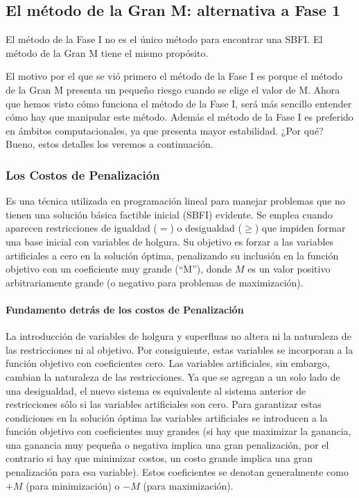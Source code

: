 \subsection{El método de la Gran M: alternativa a Fase 1}

El método de la Fase I no es el único método para encontrar una SBFI. El método de la Gran M tiene el mismo propósito.

El motivo por el que se vió primero el método de la Fase I es porque el método de la Gran M presenta un pequeño riesgo cuando se elige el valor de M. Ahora que hemos visto cómo funciona el método de la Fase I, será más sencillo entender cómo hay que manipular este método. Además el método de la Fase I es preferido en ámbitos computacionales, ya que presenta mayor estabilidad. ¿Por qué? Bueno, estos detalles los veremos a continuación.

\subsubsection{Los Costos de Penalización}

Es una técnica utilizada en programación lineal para manejar problemas que no tienen una solución básica factible inicial (SBFI) evidente. Se emplea cuando aparecen restricciones de igualdad (\(=\)) o desigualdad (\(\geq\)) que impiden formar una base inicial con variables de holgura. Su objetivo es forzar a las variables artificiales a cero en la solución óptima, penalizando su inclusión en la función objetivo con un coeficiente muy grande (``M''), donde \(M\) es un valor positivo arbitrariamente grande (o negativo para problemas de maximización).

\paragraph{Fundamento detrás de los costos de Penalización}

La introducción de variables de holgura y superfluas no altera ni la naturaleza de las restricciones ni al objetivo. Por consiguiente, estas variables se incorporan a la función objetivo con coeficientes cero. Las variables artificiales, sin embargo, cambian la naturaleza de las restricciones. Ya que se agregan a un solo lado de una desigualdad, el nuevo sistema es equivalente al sistema anterior de restricciones sólo si las variables artificiales son cero. Para garantizar estas condiciones en la solución óptima las variables artificiales se introducen a la función objetivo con coeficientes muy grandes (si hay que maximizar la ganancia, una ganancia muy pequeña o negativa implica una gran penalización, por el contrario si hay que minimizar costos, un costo grande implica una gran penalización para esa variable). Estos coeficientes se denotan generalmente como \(+M\) (para minimización) o \(-M\) (para maximización).

